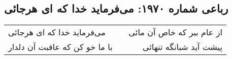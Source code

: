 \begin{center}
\section*{رباعی شماره ۱۹۷۰: می‌فرماید خدا که ای هرجائی}
\label{sec:1970}
\begin{longtable}{l p{0.5cm} r}
می‌فرماید خدا که ای هرجائی
&&
از عام ببر که خاص آن مائی
\\
با ما خو کن که عاقبت آن دلدار
&&
پیشت آید شبانگه تنهائی
\\
\end{longtable}
\end{center}

